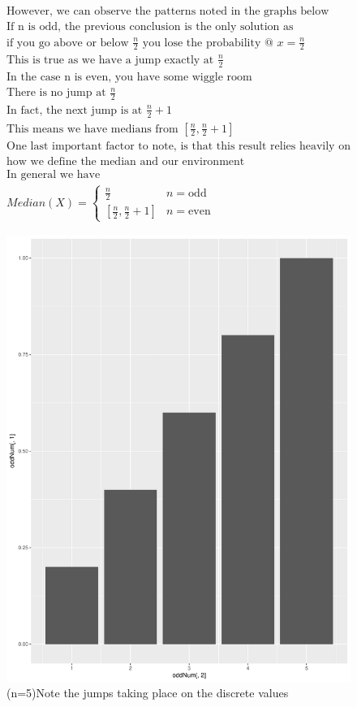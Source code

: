 \documentclass[11pt]{article}
\begin{document}
\begin{enumerate}
\begin{enumerate}
\begin{gather}
	\text{However, we can observe the patterns noted in the graphs below}\\
	\text{If n is odd, the previous conclusion is the only solution as }\\
	\text{if you go above or below } \frac{n}{2} \text{ you lose the probability @ } x = \frac{n}{2}\\
	\text{This is true as we have a jump exactly at }\frac{n}{2}\\
	\text{In the case n is even, you have some wiggle room}\\
	\text{There is no jump at }\frac{n}{2}\\
	\text{In fact, the next jump is at }\frac{n}{2}+1\\
	\text{This means we have medians from }[\frac{n}{2},\frac{n}{2}+1]\\
	\text{One last important factor to note, is that this result relies heavily on}\\
	\text{how we define the median and our environment}\\
	\text{In general we have}\\
	 Median(X) = 
	 \begin{cases}
	 \frac{n}{2} & n=\text{odd} \\
	 [\frac{n}{2},\frac{n}{2}+1] & n=\text{even}
	 \end{cases}
	\end{gather}
	\begin{figure}[H]
		\centering
		\caption{(n=5)Note the jumps taking place on the discrete values}
		\includegraphics[scale=.4]{discreteOdd.pdf}

\end{figure}
\end{enumerate}
\end{enumerate}
\end{document}
